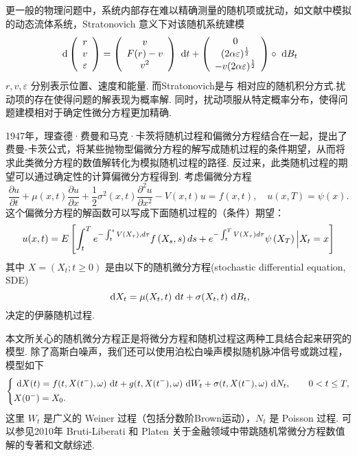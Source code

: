 更一般的物理问题中，系统内部存在难以精确测量的随机项或扰动，如文献\cite{paper_SDE_example_1}中模拟的动态流体系统，Stratonovich 意义下对该随机系统建模
\[
\text{ d} \left(\begin{array}{c}
r \\
v \\
\varepsilon
\end{array}\right)=\left(\begin{array}{c}
v \\
F(r)-v \\
v^{2}
\end{array}\right) \text{ d} t+\left(\begin{array}{c}
0 \\
(2 \alpha \varepsilon)^{\frac{1}{2}} \\
-v(2 \alpha \varepsilon)^{\frac{1}{2}}
\end{array}\right) \circ \text{ d} B_t
\]
$r,v,\varepsilon$ 分别表示位置、速度和能量. 而Stratonovich是与 \ito 相对应的随机积分方式.扰动项的存在使得问题的解表现为概率解. 同时，扰动项服从特定概率分布，使得问题建模相对于确定性微分方程更加精确. 


1947年，理查德·费曼和马克·卡茨将随机过程和偏微分方程结合在一起，提出了费曼-卡茨公式，将某些抛物型偏微分方程的解写成随机过程的条件期望，从而将求此类微分方程的数值解转化为模拟随机过程的路径. 反过来，此类随机过程的期望可以通过确定性的计算偏微分方程得到. 考虑偏微分方程
\[
\frac{\partial u}{\partial t}+\mu(x, t) \frac{\partial u}{\partial x}+\frac{1}{2} \sigma^{2}(x, t) \frac{\partial^{2} u}{\partial x^{2}}-V(x, t) u=f(x, t) , \quad 
u(x,T) = \psi(x).
\]
这个偏微分方程的解函数可以写成下面随机过程的（条件）期望：
\[
u(x, t)=E\left[\int_{t}^{T} e^{-\int_{t}^{s} V\left(X_{\tau}\right), d \tau} f\left(X_{s}, s\right) d s+e^{-\int_{t}^{T} V\left(X_{\tau}\right) d \tau} \psi\left(X_{T}\right) \Bigl| X_{t}=x\right]
\]
其中 $X = (X_t ; t \ge 0)$ 是由以下的随机微分方程(stochastic differential equation, SDE)
\[
\text{ d} X_t = \mu(X_t,t) \text{ d} t + \sigma(X_t,t) \text{ d} B_t,
\]
决定的伊藤随机过程. 


本文所关心的随机微分方程正是将微分方程和随机过程这两种工具结合起来研究的模型. 除了高斯白噪声，我们还可以使用泊松白噪声模拟随机脉冲信号或跳过程，模型如下
\[
\left\{
\begin{aligned}
&\text{ d} X(t) = f(t,X(t^-),\omega) \text{ d} t + g(t,X(t^-),\omega) \text{ d}  W_t + \sigma (t,X(t^-),\omega) \text{ d} N_t ,\qquad 0<t\le T,\\
& X(0^-) = X_0.
\end{aligned}
\right.
\]
这里 $W_t$ 是广义的 Weiner 过程（包括分数阶Brown运动），$N_t$ 是 Poisson 过程. 可以参见2010年 Bruti-Liberati 和 Platen 关于金融领域中带跳随机常微分方程数值解的专著\cite{book_jump1}和文献综述\cite{book_jump2}.



